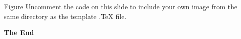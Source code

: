 \documentclass[aspectratio=169,xcolor=dvipsnames]{beamer}
\begin{document}

\begin{frame}{Figure}
	Uncomment the code on this slide to include your own image from the same directory as the template .TeX file.
\end{frame}




\begin{frame}
	\Huge{\centerline{\textbf{The End}}}
\end{frame}

\end{document}
